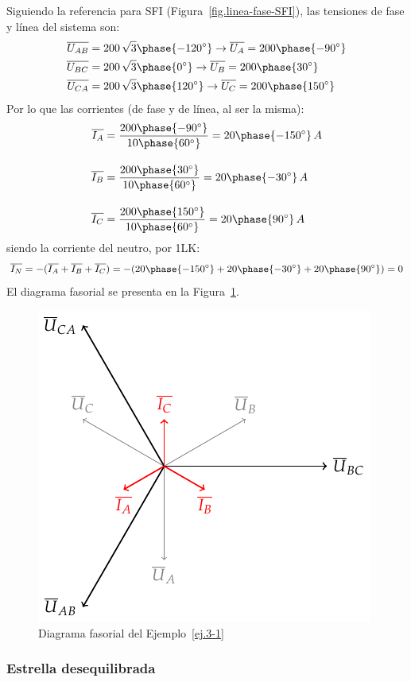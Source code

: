\begin{example}
	    Siguiendo la referencia para SFI (Figura~\ref{fig.linea-fase-SFI}), las tensiones de fase y línea del sistema son:
	    \begin{align*}
	        \overline{U_{AB}}&=200\,\sqrt{3}\phase{-120^\circ}\rightarrow \overline{U_A}=200\phase{-90^\circ}\\
	        \overline{U_{BC}}&=200\,\sqrt{3}\phase{0^\circ}\rightarrow \overline{U_B}=200\phase{30^\circ}\\
	        \overline{U_{CA}}&=200\,\sqrt{3}\phase{120^\circ}\rightarrow \overline{U_C}=200\phase{150^\circ}
	    \end{align*}
	    Por lo que las corrientes (de fase y de línea, al ser la misma):
	    \begin{align*}
	        \overline{I_A} &= \frac{200\phase{-90^\circ}}{10\phase{60^\circ}} =20\phase{-150^\circ} \,A \\[10pt]
          \overline{I_B} &= \frac{200\phase{30^\circ}}{10\phase{60^\circ}} = 20\phase{-30^\circ} \,A\\[10pt]
          \overline{I_C} &=\frac{200\phase{150^\circ}}{10\phase{60^\circ}} = 20\phase{90^\circ} \,A
	    \end{align*}
	    siendo la corriente del neutro, por 1LK:
	    \begin{equation*}
	        \overline{I_N}=-(\overline{I_A}+\overline{I_B}+\overline{I_C})=-(20\phase{-150^\circ}+20\phase{-30^\circ}+20\phase{90^\circ})=0
	    \end{equation*}
	    El diagrama fasorial se presenta en la Figura~\ref{fig.diagrama_ejemplo_3-1}. 
	    \begin{figure}[H]
	        \centering
	        \includegraphics[width=0.4\linewidth]{../figs/diagrama_ejemplo3_1.pdf}
	        \caption{Diagrama fasorial del Ejemplo~\ref{ej.3-1}}
	        \label{fig.diagrama_ejemplo_3-1}
	    \end{figure}
	\end{example}
	
	\subsubsection{Estrella desequilibrada}
	
